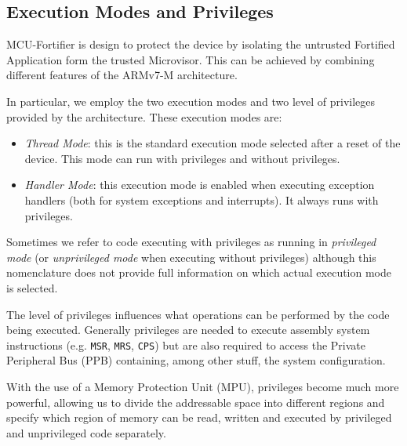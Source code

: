 \documentclass{article}
\begin{document}
\subsection{Execution Modes and Privileges}
\label{subsec:exe_mode}
MCU-Fortifier is design to protect the device by isolating the untrusted Fortified Application form the trusted Microvisor.
This can be achieved by combining different features of the ARMv7-M architecture. 

In particular, we employ the two execution modes and two level of privileges provided by the architecture. These execution modes are:
\begin{itemize}
	\item \textit{Thread Mode}: this is the standard execution mode selected after a reset of the device. This mode can run with privileges and without privileges.
	\item \textit{Handler Mode}: this execution mode is enabled when executing exception handlers (both for system exceptions and interrupts). It always runs with privileges.
\end{itemize}

Sometimes we refer to code executing with privileges as running in \textit{privileged mode} (or \textit{unprivileged mode} when executing without privileges) although this nomenclature does not provide full information on which actual execution mode is selected.

The level of privileges influences what operations can be performed by the code being executed. Generally privileges are needed to execute assembly system instructions (e.g. \verb|MSR|, \verb|MRS|, \verb|CPS|) but are also required to access the Private Peripheral Bus (PPB) containing, among other stuff, the system configuration.

With the use of a Memory Protection Unit (MPU), privileges become much more powerful, allowing us to divide the addressable space into different regions and specify which region of memory can be read, written and executed by privileged and unprivileged code separately.
\end{document}
